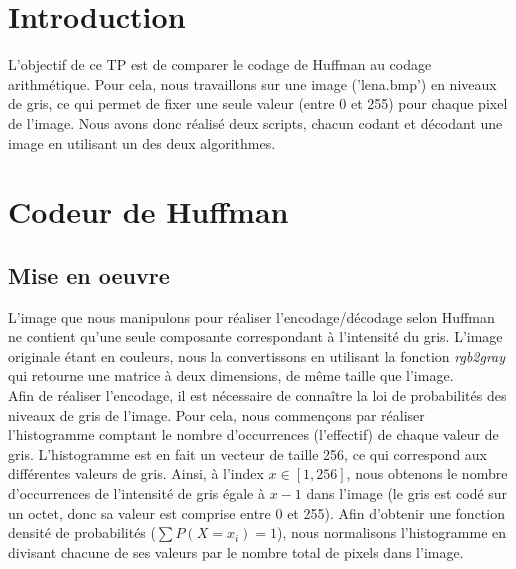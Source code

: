 \documentclass[a4paper, 12pt]{article}
\begin{document}






\clearpage

\section{Introduction}
L'objectif de ce TP est de comparer le codage de Huffman au codage arithmétique. Pour cela, nous travaillons sur une image ('lena.bmp') en niveaux de gris, ce qui permet de fixer une seule valeur (entre 0 et 255) pour chaque pixel de l'image. Nous avons donc réalisé deux scripts, chacun codant et décodant une image en utilisant un des deux algorithmes.

\section{Codeur de Huffman}

\subsection{Mise en oeuvre}

L'image que nous manipulons pour réaliser l'encodage/décodage selon Huffman ne contient qu'une seule composante correspondant à l'intensité du gris. L'image originale étant en couleurs, nous la convertissons en utilisant la fonction \textit{rgb2gray} qui retourne une matrice à deux dimensions, de même taille que l'image.\\

Afin de réaliser l'encodage, il est nécessaire de connaître la loi de probabilités des niveaux de gris de l'image. Pour cela, nous commençons par réaliser l'histogramme comptant le nombre d'occurrences (l'effectif) de chaque valeur de gris. L'histogramme est en fait un vecteur de taille 256, ce qui correspond aux différentes valeurs de gris. Ainsi, à l'index $x\in[1, 256]$, nous obtenons le nombre d’occurrences de l'intensité de gris égale à $x-1$ dans l'image (le gris est codé sur un octet, donc sa valeur est comprise entre 0 et 255). Afin d'obtenir une fonction densité de probabilités ($\sum P(X=x_{i}) = 1$), nous normalisons l'histogramme en divisant chacune de ses valeurs par le nombre total de pixels dans l'image. \\ 
\end{document}

